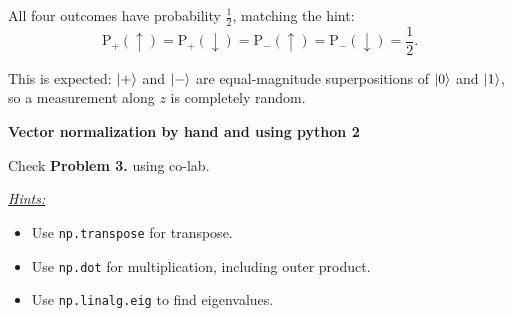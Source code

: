 \documentclass[a4paper, 10pt]{article}
\begin{document}
\begin{solution}
	\myspace

	\noindent All four outcomes have probability \( \frac{1}{2} \), matching the hint:
	\[
		\text{P}_{+}(\uparrow) = \text{P}_{+}(\downarrow) =
		\text{P}_{-}(\uparrow) = \text{P}_{-}(\downarrow) = \frac{1}{2}.
	\]

	\noindent This is expected: \( \ket{+} \) and \( \ket{-} \) are equal-magnitude superpositions of \( \ket{0} \) and \( \ket{1} \), so a measurement along \( z \) is completely random.
\end{solution}

\newpage

\begin{problem}
\textbf{Vector normalization by hand and using python 2}
\par Check \textbf{Problem 3.} using co-lab.
\par \underline{\textit{Hints:}}
\begin{itemize}
	\item Use \texttt{np.transpose} for transpose.
	\item Use \texttt{np.dot} for multiplication, including outer product.
	\item Use \texttt{np.linalg.eig} to find eigenvalues.
\end{itemize}
\end{problem}
\end{document}
